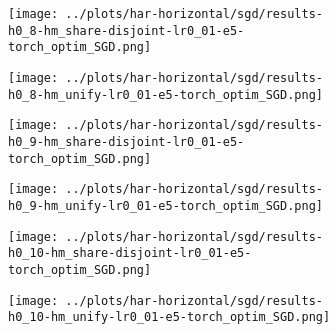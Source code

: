 \begin{figure}[htbp]  %
    \centering
    \begin{subfigure}[b]{0.47\textwidth}
        \centering
        \texttt{[image: ../plots/har-horizontal/sgd/results-h0\_8-hm\_share-disjoint-lr0\_01-e5-torch\_optim\_SGD.png]}
    \end{subfigure}
    \hfill
    \begin{subfigure}[b]{0.47\textwidth}
        \centering
        \texttt{[image: ../plots/har-horizontal/sgd/results-h0\_8-hm\_unify-lr0\_01-e5-torch\_optim\_SGD.png]}
    \end{subfigure}
\end{figure}
\begin{figure}[htbp]  %
    \centering
    \begin{subfigure}[b]{0.47\textwidth}
        \centering
        \texttt{[image: ../plots/har-horizontal/sgd/results-h0\_9-hm\_share-disjoint-lr0\_01-e5-torch\_optim\_SGD.png]}
    \end{subfigure}
    \hfill
    \begin{subfigure}[b]{0.47\textwidth}
        \centering
        \texttt{[image: ../plots/har-horizontal/sgd/results-h0\_9-hm\_unify-lr0\_01-e5-torch\_optim\_SGD.png]}
    \end{subfigure}
\end{figure}
\begin{figure}[htbp]  %
    \centering
    \begin{subfigure}[b]{0.47\textwidth}
        \centering
        \texttt{[image: ../plots/har-horizontal/sgd/results-h0\_10-hm\_share-disjoint-lr0\_01-e5-torch\_optim\_SGD.png]}
    \end{subfigure}
    \hfill
    \begin{subfigure}[b]{0.47\textwidth}
        \centering
        \texttt{[image: ../plots/har-horizontal/sgd/results-h0\_10-hm\_unify-lr0\_01-e5-torch\_optim\_SGD.png]}
    \end{subfigure}
\end{figure}



